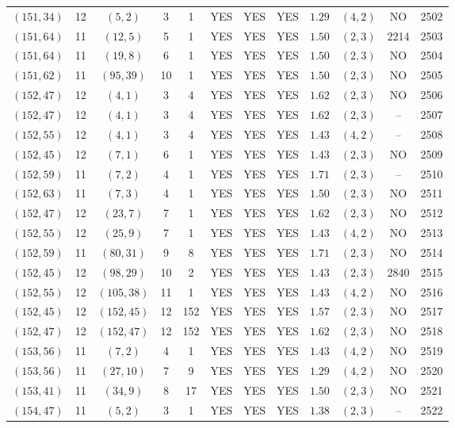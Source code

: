 \begin{longtable}{|c|c|c|c|c|c|c|c|c|c|c|c|}
$(151,34)$ & 12 & $(5,2)$ & 3 & 1 & YES & YES & YES & $1.29$ & $(4,2)$ & NO & 2502\\
$(151,64)$ & 11 & $(12,5)$ & 5 & 1 & YES & YES & YES & $1.50$ & $(2,3)$ & 2214 & 2503\\
$(151,64)$ & 11 & $(19,8)$ & 6 & 1 & YES & YES & YES & $1.50$ & $(2,3)$ & NO & 2504\\
$(151,62)$ & 11 & $(95,39)$ & 10 & 1 & YES & YES & YES & $1.50$ & $(2,3)$ & NO & 2505\\
$(152,47)$ & 12 & $(4,1)$ & 3 & 4 & YES & YES & YES & $1.62$ & $(2,3)$ & NO & 2506\\
$(152,47)$ & 12 & $(4,1)$ & 3 & 4 & YES & YES & YES & $1.62$ & $(2,3)$ & -- & 2507\\
$(152,55)$ & 12 & $(4,1)$ & 3 & 4 & YES & YES & YES & $1.43$ & $(4,2)$ & -- & 2508\\
$(152,45)$ & 12 & $(7,1)$ & 6 & 1 & YES & YES & YES & $1.43$ & $(2,3)$ & NO & 2509\\
$(152,59)$ & 11 & $(7,2)$ & 4 & 1 & YES & YES & YES & $1.71$ & $(2,3)$ & -- & 2510\\
$(152,63)$ & 11 & $(7,3)$ & 4 & 1 & YES & YES & YES & $1.50$ & $(2,3)$ & NO & 2511\\
$(152,47)$ & 12 & $(23,7)$ & 7 & 1 & YES & YES & YES & $1.62$ & $(2,3)$ & NO & 2512\\
$(152,55)$ & 12 & $(25,9)$ & 7 & 1 & YES & YES & YES & $1.43$ & $(4,2)$ & NO & 2513\\
$(152,59)$ & 11 & $(80,31)$ & 9 & 8 & YES & YES & YES & $1.71$ & $(2,3)$ & NO & 2514\\
$(152,45)$ & 12 & $(98,29)$ & 10 & 2 & YES & YES & YES & $1.43$ & $(2,3)$ & 2840 & 2515\\
$(152,55)$ & 12 & $(105,38)$ & 11 & 1 & YES & YES & YES & $1.43$ & $(4,2)$ & NO & 2516\\
$(152,45)$ & 12 & $(152,45)$ & 12 & 152 & YES & YES & YES & $1.57$ & $(2,3)$ & NO & 2517\\
$(152,47)$ & 12 & $(152,47)$ & 12 & 152 & YES & YES & YES & $1.62$ & $(2,3)$ & NO & 2518\\
$(153,56)$ & 11 & $(7,2)$ & 4 & 1 & YES & YES & YES & $1.43$ & $(4,2)$ & NO & 2519\\
$(153,56)$ & 11 & $(27,10)$ & 7 & 9 & YES & YES & YES & $1.29$ & $(4,2)$ & NO & 2520\\
$(153,41)$ & 11 & $(34,9)$ & 8 & 17 & YES & YES & YES & $1.50$ & $(2,3)$ & NO & 2521\\
$(154,47)$ & 11 & $(5,2)$ & 3 & 1 & YES & YES & YES & $1.38$ & $(2,3)$ & -- & 2522\\

\end{longtable}
